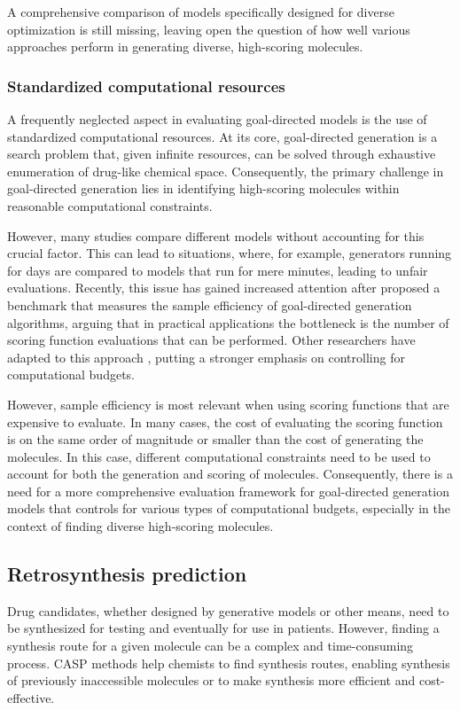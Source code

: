 A comprehensive comparison of models specifically designed for diverse optimization is still
missing, leaving open the question of how well various approaches perform in generating diverse,
high-scoring molecules.

\subsubsection{Standardized computational resources}
A frequently neglected aspect in evaluating goal-directed models is the use of standardized
computational resources. At its core, goal-directed generation is a search problem
that, given infinite resources, can be solved through exhaustive enumeration of drug-like chemical space.
Consequently, the primary challenge in goal-directed generation lies in identifying high-scoring molecules
within reasonable computational constraints.

However, many studies compare different models without accounting for this crucial factor. This can
lead to situations, where, for example, generators running for days are compared to models that run
for mere minutes, leading to unfair evaluations. Recently, this issue has gained increased attention
after \citep{gaoSampleEfficiencyMatters2022} proposed a benchmark that measures the sample
efficiency of goal-directed generation algorithms, arguing that in practical applications the
bottleneck is the number of scoring function evaluations that can be performed. Other researchers
have adapted to this approach
\citep{thomasReevaluatingSampleEfficiency2022,thomasAugmentedHillClimbIncreases2022,guoAugmentedMemorySampleEfficient2024},
putting a stronger emphasis on controlling for computational budgets.

However, sample efficiency is most relevant when using scoring functions that are expensive to
evaluate. In many cases, the cost of evaluating the scoring function is on the same order of
magnitude or smaller than the cost of generating the molecules. In this case, different
computational constraints need to be used to account for both the generation and scoring of
molecules. Consequently, there is a need for a more comprehensive evaluation framework for
goal-directed generation models that controls for various types of computational budgets, especially
in the context of finding diverse high-scoring molecules.

\subsection{Retrosynthesis prediction}
Drug candidates, whether designed by generative models or other means, need to be
synthesized for testing and eventually for use in patients. However, finding a synthesis route for a
given molecule can be a complex and time-consuming process. \Ac{CASP} methods help
chemists to find synthesis routes, enabling synthesis of previously inaccessible molecules or to make
synthesis more efficient and cost-effective.

